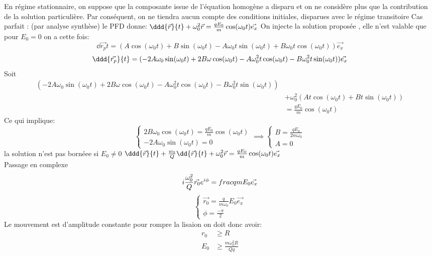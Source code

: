 \begin{Answer}
  En régime stationnaire, on suppose que la composante issue de l'équation
  homogène a disparu et on ne considère plus que la contribution de la solution
  particulière. Par conséquent, on ne tiendra aucun compte des conditions
  initiales, disparues avec le régime transitoire
  \Question Cas parfait : (par analyse synthèse)
  \subQuestion le PFD donne:
  $\ddd{\vec{r}}{t} +\omega_0^2 \vec{r} = \frac{qE_0}{m}\cos(\omega_0t)\vec{e_x}$
  On injecte la solution proposée , elle n'est valable que pour $E_0=0$
  \subQuestion on a cette fois:
  \[
 \dd{\vec{r_p}}{t}=(A\cos(\omega_0t)+B\sin(\omega_0t)-A\omega_0t\sin(\omega_0t)+B\omega_0t\cos(\omega_0t))\vec{e_x}
  \]
  \[\ddd{\vec{r_p}}{t} =(-2A \omega_0\sin(\omega_0t)+2B \omega\cos(\omega_0t)-A \omega_0^2t\cos(\omega_0t)-B \omega_0^2t\sin(\omega_0t))\vec{e_x}
  \]
  Soit
  \begin{align*}
    (-2A \omega_0\sin(\omega_0t)+2B \omega\cos(\omega_0t)-A \omega_0^2t\cos(\omega_0t)-B \omega_0^2t\sin(\omega_0t)) \\
    &+ \omega_0^2(At\cos(\omega_0t)+Bt\sin(\omega_0t))\\
    & =\frac{qE_0}{m}\cos(\omega_0t)
  \end{align*}
  Ce qui implique:
  \[
  \begin{cases}
    2B \omega_0\cos(\omega_0t) =\frac{qE_0}{m}\cos(\omega_0t)\\
    -2A \omega_0\sin(\omega_0t)=0
  \end{cases} \implies
  \begin{cases}
    B=\frac{qE_0}{2m \omega_0}\\
    A=0
  \end{cases}
  \]
  \subQuestion la solution n'est pas bornéee si $E_0\neq 0$
  \Question
  \subQuestion $\ddd{\vec{r}}{t} + \frac{w_0}{Q}\dd{\vec{r}}{t}+ \omega_0^2 \vec{r} =
  \frac{qE_0}{m}\cos(\omega_0t)\vec{e_x}$\\
  Passage en complexe
  \[ i\frac{\omega_0^2}{Q}\vec{r_0}e^{i\phi}= \\frac{q}{m}E_0 \vec{e_x} \]
  \[
    \begin{cases}
      \vec{r_0}= \frac{q}{m \omega_0}E_0 \vec{e_x}\\
      \phi = \frac{-\pi}{2}
    \end{cases}
  \]
  \subQuestion Le mouvement est d'amplitude constante pour rompre la lisaion on
  doit donc avoir:
  \begin{align*}
    r_0 &\ge R\\
    E_0&\ge \frac{m \omega_0^2R}{Qq}
  \end{align*}
\end{Answer}
